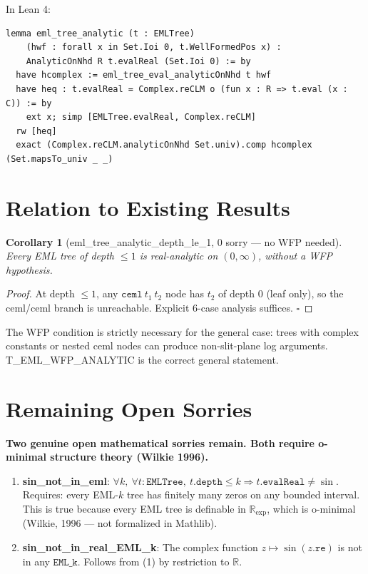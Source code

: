 \documentclass[12pt]{article}
\newtheorem{corollary}[theorem]{Corollary}
\begin{document}
In Lean 4:
\begin{lstlisting}
lemma eml_tree_analytic (t : EMLTree)
    (hwf : forall x in Set.Ioi 0, t.WellFormedPos x) :
    AnalyticOnNhd R t.evalReal (Set.Ioi 0) := by
  have hcomplex := eml_tree_eval_analyticOnNhd t hwf
  have heq : t.evalReal = Complex.reCLM o (fun x : R => t.eval (x : C)) := by
    ext x; simp [EMLTree.evalReal, Complex.reCLM]
  rw [heq]
  exact (Complex.reCLM.analyticOnNhd Set.univ).comp hcomplex (Set.mapsTo_univ _ _)
\end{lstlisting}

\section{Relation to Existing Results}

\begin{corollary}[eml\_tree\_analytic\_depth\_le\_1, 0 sorry — no WFP needed]
Every EML tree of depth $\leq 1$ is real-analytic on $(0,\infty)$, without a WFP
hypothesis.
\end{corollary}

\begin{proof}
At depth $\leq 1$, any $\mathtt{ceml}\ t_1\ t_2$ node has $t_2$ of depth 0 (leaf only),
so the ceml/ceml branch is unreachable. Explicit 6-case analysis suffices. $\square$
\end{proof}

The WFP condition is strictly necessary for the general case:
trees with complex constants or nested ceml nodes can produce non-slit-plane
log arguments. T\_EML\_WFP\_ANALYTIC is the correct general statement.

\section{Remaining Open Sorries}

\textcolor{open}{\textbf{Two genuine open mathematical sorries remain. Both require o-minimal
structure theory (Wilkie 1996).}}

\begin{enumerate}
  \item \textbf{sin\_not\_in\_eml}: $\forall k,\ \forall t : \mathtt{EMLTree},\ t.\mathtt{depth} \leq k \Rightarrow t.\mathtt{evalReal} \neq \sin$. \\
    Requires: every EML-$k$ tree has finitely many zeros on any bounded interval. \\
    This is true because every EML tree is definable in $\mathbb{R}_{\exp}$, which is
    o-minimal (Wilkie, 1996 — not formalized in Mathlib).

  \item \textbf{sin\_not\_in\_real\_EML\_k}: The complex function $z \mapsto \sin(z.\mathtt{re})$
    is not in any $\mathtt{EML\_k}$. Follows from (1) by restriction to $\mathbb{R}$.
\end{enumerate}
\end{document}
